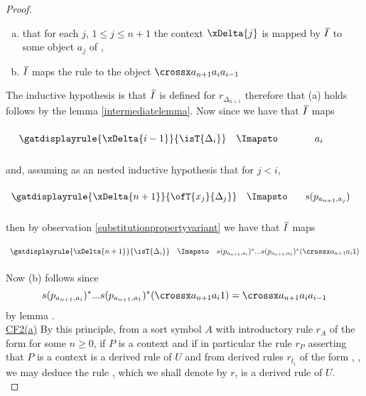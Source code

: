 \begin{proof}
\begin{enumerate}[(a)]
\item that for each $j$, $1 \leq j \leq n+1$ the context $\xDelta{j}$ is mapped by $\Ibar$ to some object $a_j$ of \catc,
\item $\Ibar$ maps the rule  to the object $\deltaimapped$
\end{enumerate} 
The inductive hypothesis is that $\Ibar$ is defined for $r_{\Delta_{n+1}}$ therefore that (a) holds follows by the lemma \ref{intermediatelemma}. 
Now since we have that $\Ibar$ maps 
\begin{equation*}
\begin{array}{c c c}
\forceSOURCEwidth & & \forceTARGETwidth \\ [-0.1cm]
\gatdisplayrule{\xDelta{i-1}}{\isT{\Delta_i}}  & \Imapsto & a_i \\ [0.4cm]
\end{array}
\end{equation*}
and, assuming as an nested inductive hypothesis that for $j < i$,
\begin{equation*}
\begin{array}{c c c }
\forceSOURCEwidth & & \forceTARGETwidth \\ [-0.1cm]
\gatdisplayrule{\xDelta{n+1}}{\ofT{x_j}{\Delta_j}}  & \Imapsto & s(p_{a_{n+1},a_j}) \\ [0.4cm]
\end{array}
\end{equation*}
then by observation \ref{substitutionpropertyvariant} 
we have that $\Ibar$ maps
\begin{equation*}
\begin{array}{c c c}
\forceSOURCEwidth & & \forceTARGETwidth \\ [-0.1cm]
\gatdisplayrule{\xDelta{n+1}}{\isT{\Delta_i}}  & \Imapsto & \deltaimappedlong \\ [0.4cm]
\end{array}
\end{equation*}
Now (b) follows since 
\begin{equation*}
\deltaimappedlong = \deltaimapped
\end{equation*}  
by lemma . \\
\underline{CF2(a)}
By this principle, from a sort symbol $A$ with introductory rule $r_A$ of the form  for some $n \geq 0$, if
$P$ is a context and if in particular the rule $r_P$ asserting that $P$ is a context is a derived rule of $U$
and from derived rules $r_{t_i}$ of the form , \foreachi, we may deduce
the rule , which we shall denote by $r$, is a derived rule of $U$. \\


\end{proof}
